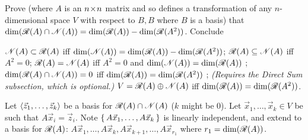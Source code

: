 \begin{exercises}
\begin{answer}
    \end{answer}
  \item  
    \cite{Monthly55p721}
    Prove
    (where \( A \) is an \( n \! \times \! n \) matrix and so defines
    a transformation of any \( n \)-dimensional space \( V \)
    with respect to \( B,B \) where \( B \) is a basis) that
    \( \dim(\mathscr{R}(A)\cap\mathscr{N}(A))
           =\dim(\mathscr{R}(A))-\dim(\mathscr{R}(A^2)) \).
    Conclude
    \begin{exparts}
      \partsitem \( \mathscr{N}(A)\subset\mathscr{R}(A) \)
            iff
            \( \dim(\mathscr{N}(A))=\dim(\mathscr{R}(A))
                                   -\dim(\mathscr{R}(A^2)) \);
      \partsitem \( \mathscr{R}(A)\subseteq\mathscr{N}(A) \)
            iff
            \( A^2=0 \);
      \partsitem \( \mathscr{R}(A)=\mathscr{N}(A) \)
            iff
            \( A^2=0 \)
            and \( \dim(\mathscr{N}(A))=\dim(\mathscr{R}(A)) \) ;
      \partsitem \( \dim(\mathscr{R}(A)\cap\mathscr{N}(A))=0 \)
            iff
            \( \dim(\mathscr{R}(A))=\dim(\mathscr{R}(A^2)) \) ;
      \partsitem \textit{(Requires the Direct Sum subsection, 
            which is optional.)}
            \( V=\mathscr{R}(A)\oplus\mathscr{N}(A) \)
            iff
            \( \dim(\mathscr{R}(A))=\dim(\mathscr{R}(A^2)) \).
    \end{exparts}
    \begin{answer}
      \answerasgiven
      Let \( \langle\vec{z}_1,\dots,\vec{z}_k\rangle \) be a basis for
      \( \mathscr{R}(A)\cap\mathscr{N}(A) \)
      (\( k \) might be \( 0 \)).
      Let \( \vec{x}_1,\dots,\vec{x}_k\in V \) be such that
      \( A\vec{x}_i=\vec{z}_i \).
      Note \( \mbox{$\{\,A\vec{x}_1,\dots,A\vec{x}_k\,\}$} \) is linearly independent,
      and extend to a basis for \( \mathscr{R}(A) \):
      \( A\vec{x}_1,\ldots,A\vec{x}_k,A\vec{x}_{k+1},\dots,A\vec{x}_{r_1} \)
      where \( r_1=\dim(\mathscr{R}(A)) \).


\end{answer}
\end{exercises}
